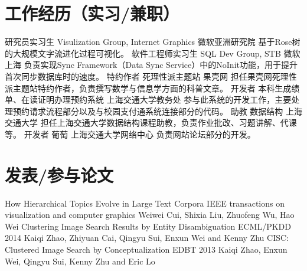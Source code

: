 \documentclass[10pt,a4paper,roman]{moderncv} %
\begin{document}
\section{工作经历（实习/兼职）}
        {研究员实习生}
        {Visulization Group, Internet Graphics}
        {微软亚洲研究院}
        {}
        {基于Rose树的大规模文字流进化过程可视化。\footnotemark[3]{}}
        {软件工程师实习生}
        {SQL Dev Group, STB}
        {微软上海}
        {}
        {负责实现Sync Framework（Data Sync Service）中的NoInit功能，用于提升首次同步数据库时的速度。}
        {特约作者}
        {死理性派主题站}
        {果壳网\footnotemark[4]{}}
        {}
        {担任果壳网死理性派主题站特约作者，负责撰写数学与信息学方面的科普文章\footnotemark[5]{}。}
        {开发者}
        {本科生成绩单、在读证明办理预约系统}
        {上海交通大学教务处}
        {}
        {参与此系统的开发工作，主要处理预约请求流程部分以及与校园支付通系统连接部分的代码。}
        {助教}
        {数据结构}
        {上海交通大学}
        {}
        {担任上海交通大学数据结构课程助教，负责作业批改、习题讲解、代课等。\footnotemark[6]{}}
        {开发者}
        {葡萄\footnotemark[7]{}}
        {上海交通大学网络中心}
        {}
        {负责网站论坛部分的开发。}

\section{发表/参与论文}
        {How Hierarchical Topics Evolve in Large Text Corpora\footnotemark[8]}
        {IEEE transactions on visualization and computer graphics{}}{}{}
        {Weiwei Cui, Shixia Liu, Zhuofeng Wu, Hao Wei}
        {Clustering Image Search Results by Entity Disambiguation}
        {ECML/PKDD 2014}{}{}
        {Kaiqi Zhao, Zhiyuan Cai, Qingyu Sui, Enxun Wei and Kenny Zhu}
        {CISC: Clustered Image Search by Conceptualization}
        {EDBT 2013}{}{}
        {Kaiqi Zhao, Enxun Wei, Qingyu Sui, Kenny Zhu and Eric Lo}
\end{document}
